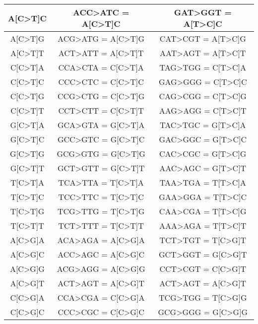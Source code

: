\begin{longtable}{c|c|c}
\ttfamily A[C>T]C & \ttfamily ACC>ATC = A[C>T]C & \ttfamily GAT>GGT = A[T>C]C \\ \hline
\ttfamily A[C>T]G & \ttfamily ACG>ATG = A[C>T]G & \ttfamily CAT>CGT = A[T>C]G \\ \hline
\ttfamily A[C>T]T & \ttfamily ACT>ATT = A[C>T]T & \ttfamily AAT>AGT = A[T>C]T \\ \hline
\ttfamily C[C>T]A & \ttfamily CCA>CTA = C[C>T]A & \ttfamily TAG>TGG = C[T>C]A \\ \hline
\ttfamily C[C>T]C & \ttfamily CCC>CTC = C[C>T]C & \ttfamily GAG>GGG = C[T>C]C \\ \hline
\ttfamily C[C>T]G & \ttfamily CCG>CTG = C[C>T]G & \ttfamily CAG>CGG = C[T>C]G \\ \hline
\ttfamily C[C>T]T & \ttfamily CCT>CTT = C[C>T]T & \ttfamily AAG>AGG = C[T>C]T \\ \hline
\ttfamily G[C>T]A & \ttfamily GCA>GTA = G[C>T]A & \ttfamily TAC>TGC = G[T>C]A \\ \hline
\ttfamily G[C>T]C & \ttfamily GCC>GTC = G[C>T]C & \ttfamily GAC>GGC = G[T>C]C \\ \hline
\ttfamily G[C>T]G & \ttfamily GCG>GTG = G[C>T]G & \ttfamily CAC>CGC = G[T>C]G \\ \hline
\ttfamily G[C>T]T & \ttfamily GCT>GTT = G[C>T]T & \ttfamily AAC>AGC = G[T>C]T \\ \hline
\ttfamily T[C>T]A & \ttfamily TCA>TTA = T[C>T]A & \ttfamily TAA>TGA = T[T>C]A \\ \hline
\ttfamily T[C>T]C & \ttfamily TCC>TTC = T[C>T]C & \ttfamily GAA>GGA = T[T>C]C \\ \hline
\ttfamily T[C>T]G & \ttfamily TCG>TTG = T[C>T]G & \ttfamily CAA>CGA = T[T>C]G \\ \hline
\ttfamily T[C>T]T & \ttfamily TCT>TTT = T[C>T]T & \ttfamily AAA>AGA = T[T>C]T \\ \hline
\ttfamily A[C>G]A & \ttfamily ACA>AGA = A[C>G]A & \ttfamily TCT>TGT = T[C>G]T \\ \hline
\ttfamily A[C>G]C & \ttfamily ACC>AGC = A[C>G]C & \ttfamily GCT>GGT = G[C>G]T \\ \hline
\ttfamily A[C>G]G & \ttfamily ACG>AGG = A[C>G]G & \ttfamily CCT>CGT = C[C>G]T \\ \hline
\ttfamily A[C>G]T & \ttfamily ACT>AGT = A[C>G]T & \ttfamily ACT>AGT = A[C>G]T \\ \hline
\ttfamily C[C>G]A & \ttfamily CCA>CGA = C[C>G]A & \ttfamily TCG>TGG = T[C>G]G \\ \hline
\ttfamily C[C>G]C & \ttfamily CCC>CGC = C[C>G]C & \ttfamily GCG>GGG = G[C>G]G \\ \hline

\end{longtable}
